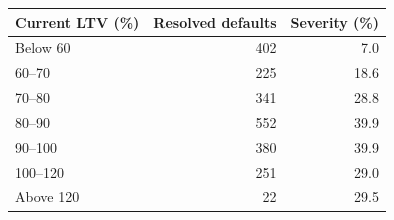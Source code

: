 \begin{tabular}{lrr}
\toprule
Current LTV (\%) & Resolved defaults & Severity (\%) \\
\midrule
Below 60 & 402 & 7.0 \\
60--70 & 225 & 18.6 \\
70--80 & 341 & 28.8 \\
80--90 & 552 & 39.9 \\
90--100 & 380 & 39.9 \\
100--120 & 251 & 29.0 \\
Above 120 & 22 & 29.5 \\
\bottomrule
\end{tabular}
